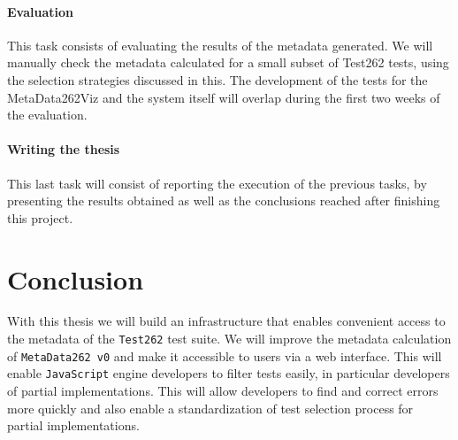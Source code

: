 \documentclass[runningheads]{llncs}
\begin{document}
\paragraph{Evaluation}
This task consists of evaluating the results of the metadata generated. We will manually check the metadata calculated for a small subset of Test262 tests, using the selection strategies discussed in this. The development of the tests for the MetaData262Viz and the system itself will overlap during the first two weeks of the evaluation.


\paragraph{Writing the thesis}
This last task will consist of reporting the execution of the previous tasks, by presenting the results obtained as well as the conclusions reached after finishing this project.




\section{Conclusion}
\label{sec:Conclusion}
With this thesis we will build an infrastructure that enables convenient access to the metadata of the \texttt{Test262} test suite. We will improve the metadata calculation of \texttt{MetaData262 v0} and make it accessible to users via a web interface. This will enable \texttt{JavaScript} engine developers to filter tests easily, in particular developers of partial implementations. This will allow developers to find and correct errors more quickly and also enable a standardization of test selection process for partial implementations.



%
%

%
%
%
% 
% 
%


\end{document}
